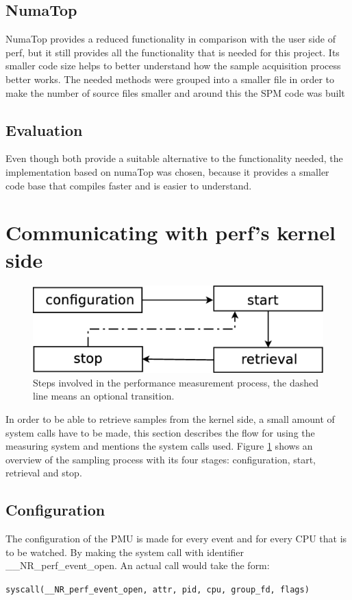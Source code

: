 \subsection{NumaTop}\label{section:numatop}
NumaTop provides a reduced functionality in comparison with the user side of perf, but it still provides all the functionality that is needed for this project. Its smaller code size helps to better understand how the sample acquisition process better works. The needed methods were grouped into a smaller file in order to make the number of source files smaller and around this the SPM code was built

\subsection{Evaluation}\label{section:sol-evltn}
Even though both provide a suitable alternative to the functionality needed, the implementation based on numaTop was chosen, because it provides a smaller code base that compiles faster and is easier to understand. 

\section{Communicating with perf's kernel side}\label{section:ovv-perfks}

\begin{figure}
	\centering
		\includegraphics[width=.7\textwidth]{figures/sampling-process.eps}
		\caption[Steps of the performance measurement process]{Steps involved in the performance measurement process, the dashed line means an optional transition.}
		\label{fig:sprocess}
\end{figure}

In order to be able to retrieve samples from the kernel side, a small amount of system calls have to be made, this section describes the flow for using the measuring system and mentions the system calls used. Figure \ref{fig:sprocess} shows an overview of the sampling process with its four stages: configuration, start, retrieval and stop.

\subsection{Configuration}\label{section:confgtn}
The configuration of the PMU is made for every event and for every CPU that is to be watched. By making the system call with identifier \_\_NR\_perf\_event\_open. An actual call would take the form: 
\\
\begin{center}
\texttt{syscall(\_\_NR\_perf\_event\_open, attr, pid, cpu, group\_fd, flags) }
\end{center}

